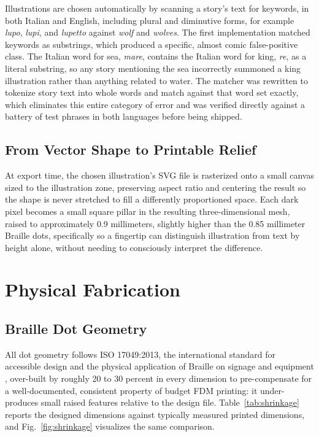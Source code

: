 \documentclass[conference]{IEEEtran}
\begin{document}
Illustrations are chosen automatically by scanning a story's text for keywords, in both Italian and English, including plural and diminutive forms, for example \emph{lupo}, \emph{lupi}, and \emph{lupetto} against \emph{wolf} and \emph{wolves}. The first implementation matched keywords as substrings, which produced a specific, almost comic false-positive class. The Italian word for sea, \emph{mare}, contains the Italian word for king, \emph{re}, as a literal substring, so any story mentioning the sea incorrectly summoned a king illustration rather than anything related to water. The matcher was rewritten to tokenize story text into whole words and match against that word set exactly, which eliminates this entire category of error and was verified directly against a battery of test phrases in both languages before being shipped.

\subsection{From Vector Shape to Printable Relief}

At export time, the chosen illustration's SVG file is rasterized onto a small canvas sized to the illustration zone, preserving aspect ratio and centering the result so the shape is never stretched to fill a differently proportioned space. Each dark pixel becomes a small square pillar in the resulting three-dimensional mesh, raised to approximately 0.9 millimeters, slightly higher than the 0.85 millimeter Braille dots, specifically so a fingertip can distinguish illustration from text by height alone, without needing to consciously interpret the difference.

\section{Physical Fabrication}\label{sec:fabrication}

\subsection{Braille Dot Geometry}

All dot geometry follows ISO 17049:2013, the international standard for accessible design and the physical application of Braille on signage and equipment \cite{iso17049}, over-built by roughly 20 to 30 percent in every dimension to pre-compensate for a well-documented, consistent property of budget FDM printing: it under-produces small raised features relative to the design file. Table~\ref{tab:shrinkage} reports the designed dimensions against typically measured printed dimensions, and Fig.~\ref{fig:shrinkage} visualizes the same comparison.
\end{document}
